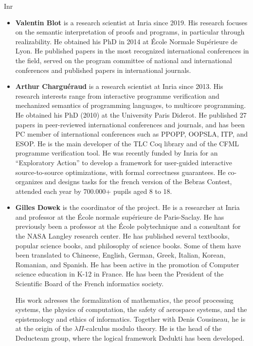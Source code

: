 \begin{sitedescription}{Inr}
\begin{itemize}
\item{\bf Valentin Blot} is a research scientist at Inria since 2019. His research focuses on the semantic interpretation of proofs and programs, in particular through realizability. He obtained his PhD in 2014 at \'Ecole Normale Sup\'erieure de Lyon. He published papers in the most recognized international conferences in the field, served on the program committee of national and international conferences and published papers in international journals.

\item{\bf Arthur Charguéraud} is a research scientist at Inria since 2013.
His research interests range from interactive programme verification and mechanized
semantics of programming languages, to multicore programming.
He obtained his PhD (2010) at the University Paris Diderot. He published 27 papers
in peer-reviewed international conferences and journals, and has been PC member
of international conferences such as PPOPP, OOPSLA, ITP, and ESOP. He is the main
developer of the TLC Coq library and of the CFML programme verification tool.
He was recently funded by Inria for an ``Exploratory Action'' to develop a framework
for user-guided interactive source-to-source optimizations, with formal correctness
guarantees.
He co-organizes and designs tasks for the french version of the Bebras Contest,
attended each year by 700.000+ pupils aged 8 to 18.


\item{\bf Gilles Dowek} is the coordinator of the project.
He is a researcher at Inria and professor at the École
normale supérieure de Paris-Saclay. He has previously been a professor
at the École polytechnique and a consultant for the NASA Langley
research center. He has published several textbooks, popular science
books, and philosophy of science books. Some of them have been
translated to Chineese, English, German, Greek, Italian, Korean,
Romanian, and Spanish. He has been active in the promotion of
Computer science education in K-12 in France. He has been the
President of the Scientific Board of the French informatics society.

His work adresses the formalization of mathematics, the proof
processing systems, the physics of computation, the safety of
aerospace systems, and the epistemology and ethics of informatics.
Together with Denis Cousineau, he is at the origin of the
$\lambda\Pi$-calculus modulo theory. He is the head of the Deducteam
group, where the logical framework Dedukti has been developed.


\end{itemize}
\end{sitedescription}
